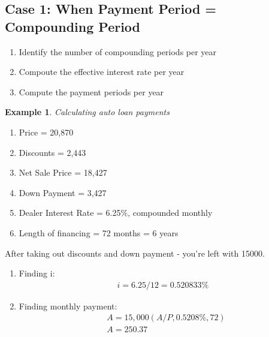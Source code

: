 \documentclass{report} %
\newtheorem{exmp}{Example}
\begin{document}
\subsection*{Case 1: When Payment Period = Compounding Period}
\begin{enumerate}
    \item Identify the number of compounding periods per year
    \item Compoute the effective interest rate per year
    \item Compute the payment periods per year
\end{enumerate}

\begin{exmp}
    Calculating auto loan payments
\end{exmp}
\begin{center}
    \begin{enumerate}
        \item Price = 20,870
        \item Discounts = 2,443
        \item Net Sale Price = 18,427
        \item Down Payment = 3,427
        \item Dealer Interest Rate = 6.25\%, compounded monthly
        \item Length of financing  = 72 months = 6 years
    \end{enumerate}    
\end{center}
After taking out discounts and down payment - you're left with 15000. 
\newline
\begin{enumerate}
    \item Finding i:
    \begin{equation*}
        \begin{aligned}
            i = 6.25/12 = 0.520833\%
        \end{aligned}
    \end{equation*}
    \item Finding monthly payment:
    \begin{equation*}
        \begin{aligned}
            &A = 15,000(A/P,0.5208\%,72) \\
            &A = 250.37
        \end{aligned}
    \end{equation*}
\end{enumerate}
\end{document}
